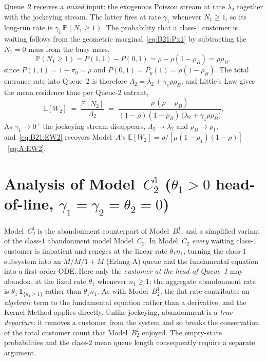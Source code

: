 Queue~2 receives a \emph{mixed} input: the exogenous Poisson stream at rate $\lambda_2$
together with the jockeying stream. The latter fires at rate $\gamma_1$ whenever $N_1\ge1$,
so its long-run rate is $\gamma_1\,\mathbb{P}(N_1\ge1)$. The probability that a class-$1$
customer is waiting follows from the geometric marginal~\eqref{eq:B21:Px1} by subtracting
the $N_1=0$ mass from the busy mass,
\begin{equation*}
    \mathbb{P}(N_1\ge1) = P(1,1)-P(0,1) = \rho - \rho(1-\rho_B) = \rho\rho_B,
\end{equation*}
since $P(1,1)=1-\pi_0=\rho$ and $P(0,1)=P_y(1)=\rho(1-\rho_B)$. The total entrance rate into
Queue~2 is therefore $\Lambda_2=\lambda_2+\gamma_1\rho\rho_B$, and Little's Law gives the
mean residence time per Queue-2 entrant,
\begin{equation}
    \mathbb{E}[W_2] \;=\; \frac{\mathbb{E}[N_2]}{\Lambda_2}
    \;=\; \frac{\rho\,(\rho-\rho_B)}
               {(1-\rho)(1-\rho_B)\,\bigl(\lambda_2+\gamma_1\rho\rho_B\bigr)}.
    \label{eq:B21:EW2}
\end{equation}
As $\gamma_1\to0^+$ the jockeying stream disappears, $\Lambda_2\to\lambda_2$ and
$\rho_B\to\rho_1$, and~\eqref{eq:B21:EW2} recovers Model~$A$'s
$\mathbb{E}[W_2]=\rho/[\mu(1-\rho_1)(1-\rho)]$~\eqref{eq:A:EW2}.


\section{Analysis of Model~\texorpdfstring{$C_2^1$}{C21} (\texorpdfstring{$\theta_1>0$}{theta1>0} head-of-line, \texorpdfstring{$\gamma_1=\gamma_2=\theta_2=0$}{gamma1=gamma2=theta2=0})}
\label{sec:model_c21}

Model~$C_2^1$ is the abandonment counterpart of Model~$B_2^1$, and a simplified variant of
the class-$1$ abandonment model Model~$C_2$. In Model~$C_2$ \emph{every} waiting class-$1$
customer is impatient and reneges at the linear rate $\theta_1 n_1$, turning the class-$1$
subsystem into an $M/M/1{+}M$ (Erlang-A) queue and the fundamental equation into a
first-order ODE. Here only the \emph{customer at the head of Queue~1} may abandon, at the
fixed rate $\theta_1$ whenever $n_1\ge1$; the aggregate abandonment rate is
$\theta_1\,\mathbf{1}_{\{n_1\ge1\}}$ rather than $\theta_1 n_1$. As with Model~$B_2^1$, the
flat rate contributes an \emph{algebraic} term to the fundamental equation rather than a
derivative, and the Kernel Method applies directly. Unlike jockeying, abandonment is a
\emph{true departure}: it removes a customer from the system and so breaks the conservation
of the total customer count that Model~$B_2^1$ enjoyed. The empty-state probabilities and
the class-$2$ mean queue length consequently require a separate argument.

